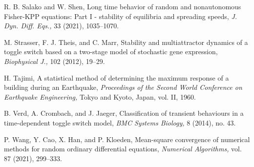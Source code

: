 \documentclass[reqno,12pt]{amsart}
\theoremstyle{plain} %
\theoremstyle{definition} %
\begin{document}
\begin{thebibliography}{25}
     R. B. Salako and W. Shen, Long time behavior of random and nonautonomous Fisher-KPP equations: Part I - stability of equilibria and spreading speeds, \emph{J. Dyn. Diff. Eqs.,} 33 (2021), 1035--1070.

     M. Strasser, F. J. Theis, and C. Marr, Stability and multiattractor dynamics of a toggle switch based on a two-stage model of stochastic gene expression, \emph{Biophysical J.,} 102 (2012), 19--29.

     H. Tajimi, A statistical method of determining the maximum response of a building during an Earthquake, \emph{Proceedings of the Second World Conference on Earthquake Engineering,} Tokyo and Kyoto, Japan, vol. II, 1960.
    
     B. Verd, A. Crombach, and J. Jaeger, Classification of transient behaviours in a time-dependent toggle switch model, \emph{BMC Systems Biology,} 8 (2014), no. 43.

     P. Wang, Y. Cao, X. Han, and P. Kloeden, Mean-square convergence of numerical methods for random ordinary differential equations, \emph{Numerical Algorithms,} vol. 87 (2021), 299--333.

\end{thebibliography}
\end{document}
